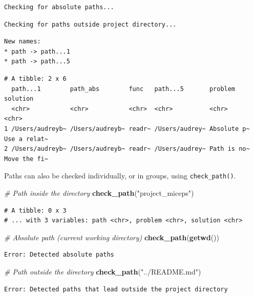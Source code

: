 \documentclass[12pt,twoside]{reedthesis}
\newenvironment{Shaded}{\begin{snugshade}}{\end{snugshade}}
\newcommand{\KeywordTok}[1]{\textcolor[rgb]{0.13,0.29,0.53}{\textbf{#1}}}
\newcommand{\StringTok}[1]{\textcolor[rgb]{0.31,0.60,0.02}{#1}}
\newcommand{\CommentTok}[1]{\textcolor[rgb]{0.56,0.35,0.01}{\textit{#1}}}
\newcommand{\NormalTok}[1]{#1}
\begin{document}
\begin{verbatim}
Checking for absolute paths...
\end{verbatim}
\begin{verbatim}
Checking for paths outside project directory...
\end{verbatim}
\begin{verbatim}
New names:
* path -> path...1
* path -> path...5
\end{verbatim}
\begin{verbatim}
# A tibble: 2 x 6
  path...1        path_abs        func   path...5       problem     solution    
  <chr>           <chr>           <chr>  <chr>          <chr>       <chr>       
1 /Users/audreyb~ /Users/audreyb~ readr~ /Users/audrey~ Absolute p~ Use a relat~
2 /Users/audreyb~ /Users/audreyb~ readr~ /Users/audrey~ Path is no~ Move the fi~
\end{verbatim}
Paths can also be checked individually, or in groups, using
\texttt{check\_path()}.

\footnotesize
\begin{Shaded}
\begin{Highlighting}[]
\CommentTok{# Path inside the directory}
\KeywordTok{check_path}\NormalTok{(}\StringTok{"project_miceps"}\NormalTok{)}
\end{Highlighting}
\end{Shaded}
\begin{verbatim}
# A tibble: 0 x 3
# ... with 3 variables: path <chr>, problem <chr>, solution <chr>
\end{verbatim}
\begin{Shaded}
\begin{Highlighting}[]
\CommentTok{# Absolute path (current working directory)}
\KeywordTok{check_path}\NormalTok{(}\KeywordTok{getwd}\NormalTok{())}
\end{Highlighting}
\end{Shaded}
\begin{verbatim}
Error: Detected absolute paths
\end{verbatim}
\begin{Shaded}
\begin{Highlighting}[]
\CommentTok{# Path outside the directory}
\KeywordTok{check_path}\NormalTok{(}\StringTok{"../README.md"}\NormalTok{)}
\end{Highlighting}
\end{Shaded}
\begin{verbatim}
Error: Detected paths that lead outside the project directory
\end{verbatim}
\normalsize
\end{document}

